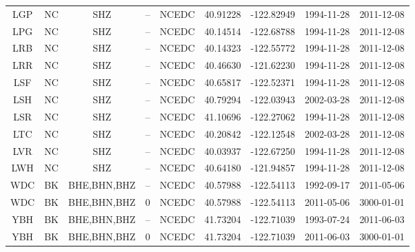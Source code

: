 \documentclass[draft]{agujournal2019}
\begin{document}
\begin{table}[hbt!]
\begin{tabular}{c c c c c c c c c}
LGP & NC & SHZ & -- & NCEDC & 40.91228 & -122.82949 & 1994-11-28 & 2011-12-08 \\
LPG & NC & SHZ & -- & NCEDC & 40.14514 & -122.68788 & 1994-11-28 & 2011-12-08 \\
LRB & NC & SHZ & -- & NCEDC & 40.14323 & -122.55772 & 1994-11-28 & 2011-12-08 \\
LRR & NC & SHZ & -- & NCEDC & 40.46630 & -121.62230 & 1994-11-28 & 2011-12-08 \\
LSF & NC & SHZ & -- & NCEDC & 40.65817 & -122.52371 & 1994-11-28 & 2011-12-08 \\
LSH & NC & SHZ & -- & NCEDC & 40.79294 & -122.03943 & 2002-03-28 & 2011-12-08 \\
LSR & NC & SHZ & -- & NCEDC & 41.10696 & -122.27062 & 1994-11-28 & 2011-12-08 \\
LTC & NC & SHZ & -- & NCEDC & 40.20842 & -122.12548 & 2002-03-28 & 2011-12-08 \\
LVR & NC & SHZ & -- & NCEDC & 40.03937 & -122.67250 & 1994-11-28 & 2011-12-08 \\
LWH & NC & SHZ & -- & NCEDC & 40.64180 & -121.94857 & 1994-11-28 & 2011-12-08 \\
WDC & BK & BHE,BHN,BHZ & -- & NCEDC & 40.57988 & -122.54113 & 1992-09-17 & 2011-05-06 \\
WDC & BK & BHE,BHN,BHZ & 0 & NCEDC & 40.57988 & -122.54113 & 2011-05-06 & 3000-01-01 \\
YBH & BK & BHE,BHN,BHZ & -- & NCEDC & 41.73204 & -122.71039 & 1993-07-24 & 2011-06-03 \\
YBH & BK & BHE,BHN,BHZ & 0 & NCEDC & 41.73204 & -122.71039 & 2011-06-03 & 3000-01-01 \\
\hline
\end{tabular}
\end{table}

\newpage
\end{document}
